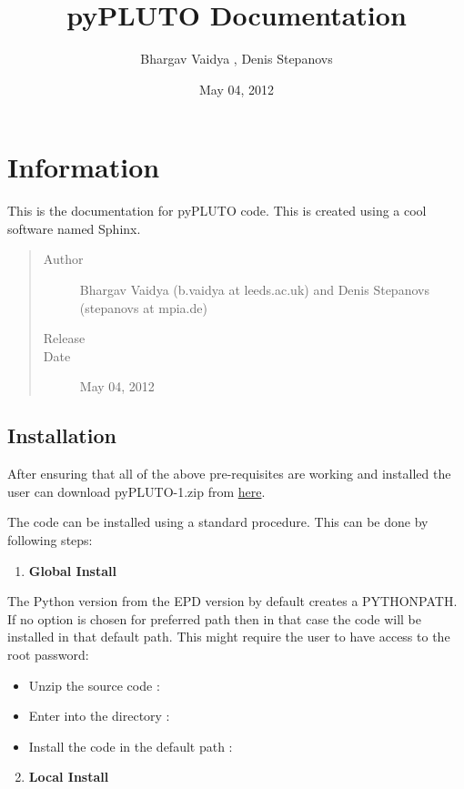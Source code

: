 \documentclass[letterpaper,10pt,english]{sphinxmanual}
\title{pyPLUTO Documentation}
\date{May 04, 2012}
\author{Bhargav Vaidya , Denis Stepanovs}
\begin{document}
\maketitle
\tableofcontents
{}\label{index::doc}



\chapter{Information}
\label{index:information}\label{index:welcome-to-pypluto-s-documentation}
This is the documentation for pyPLUTO code.
This is created using a cool software named Sphinx.
\begin{quote}\begin{description}
\item[{Author}] \leavevmode
Bhargav Vaidya (b.vaidya at leeds.ac.uk) and Denis Stepanovs (stepanovs at mpia.de)

\item[{Release}] 

\item[{Date}] \leavevmode
May 04, 2012

\end{description}\end{quote}


\section{Installation}
\label{install:installation}\label{install::doc}
After ensuring that all of the above pre-requisites are working and
installed the user can download  pyPLUTO-1.zip from \href{http://www.ast.leeds.ac.uk/~phybva/Bhargav\_Vaidya/Simulations.html}{here}.

The code can be installed using a standard procedure. This can be done by following steps:
\begin{enumerate}
\item {} 
\textbf{Global Install}

\end{enumerate}

The Python version from the EPD version by default creates a PYTHONPATH. If no option is chosen for preferred path
then in that case the code will be installed in that default path.  This might require the user to have access to the root password:
\begin{itemize}
\item {} 
Unzip the source code : 

\item {} 
Enter into the directory : 

\item {} 
Install the code in the default path : 

\end{itemize}
\begin{enumerate}
\setcounter{enumi}{1}
\item {} 
\textbf{Local Install}

\end{enumerate}
\end{document}
